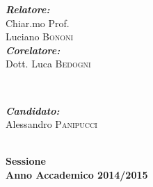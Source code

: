 \begin{titlepage}

\begin{minipage}{0.4\textwidth}
	\begin{flushleft} \large
		\emph{ \bfseries Relatore:} \\
		Chiar.mo Prof. \\ Luciano \textsc{Bononi} %
		\\[0.1cm] %

		\emph{ \bfseries Corelatore:} \\
		Dott. Luca \textsc{Bedogni} %
	\end{flushleft}

\end{minipage}
~
\begin{minipage}{0.4\textwidth}
	\begin{flushright} \large
		\emph{ \bfseries Candidato:}\\
		Alessandro \textsc{Panipucci}\\[0.1cm]
	\end{flushright}
	\begin{flushright} \large
	\end{flushright}
	
	\begin{flushright} 
	\end{flushright}
\end{minipage}\\[0.7cm]




{ \large \bfseries {} {Sessione}\\
\bfseries Anno Accademico 2014/2015}



 

\vfill %

\end{titlepage}

